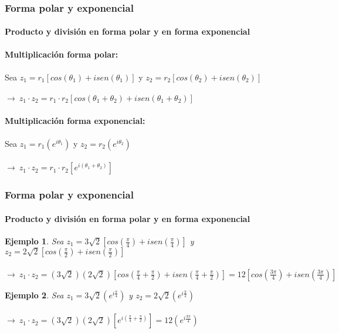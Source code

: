 \documentclass[11pt]{beamer}
\newtheorem{ejem}{Ejemplo}
\begin{document}
\begin{frame}
\frametitle{Forma polar y exponencial}
\framesubtitle{Producto y división en forma polar y en forma exponencial}
\textbf{Multiplicación forma polar:}\\ \hspace{0cm} \\
Sea $z_1 = r_1[cos(\theta_1) + isen(\theta_1)]$ y $z_2 = r_2[cos(\theta_2) + isen(\theta_2)]$\\ \hspace{0cm} \\
$\rightarrow~z_1\cdot z_2 = r_1\cdot r_2[cos(\theta_1 + \theta_2) + isen(\theta_1 + \theta_2)]$\\ \hspace{0cm} \\
\textbf{Multiplicación forma exponencial:}\\ \hspace{0cm} \\
Sea $z_1 = r_1(e^{i\theta_1})$ y $z_2 = r_2(e^{i\theta_2})$\\ \hspace{0cm} \\
$\rightarrow~z_1\cdot z_2 = r_1\cdot r_2[e^{i(\theta_1+\theta_2)}]$
\end{frame}

\begin{frame}
\frametitle{Forma polar y exponencial}
\framesubtitle{Producto y división en forma polar y en forma exponencial}
\begin{ejem}
Sea $z_1 = 3\sqrt{2}[cos(\frac{\pi}{4}) + isen(\frac{\pi}{4})]$ y $z_2 = 2\sqrt{2}[cos(\frac{\pi}{2}) + isen(\frac{\pi}{2})]$\\ \hspace{0cm} \\
$\rightarrow~z_1\cdot z_2 = (3\sqrt{2})(2\sqrt{2})[cos(\frac{\pi}{4}+\frac{\pi}{2}) + isen(\frac{\pi}{4}+\frac{\pi}{2})] = 
12[cos(\frac{3\pi}{4}) + isen(\frac{3\pi}{4})]$
\end{ejem}
\begin{ejem}
Sea $z_1 = 3\sqrt{2}(e^{i\frac{\pi}{4}})$ y $z_2 = 2\sqrt{2}(e^{i\frac{\pi}{2}})$\\ \hspace{0cm} \\
$\rightarrow~z_1\cdot z_2 = (3\sqrt{2})(2\sqrt{2})[e^{i(\frac{\pi}{4}+\frac{\pi}{2})}] = 12(e^{i\frac{3\pi}{4}})$
\end{ejem}
\end{frame}
\end{document}
